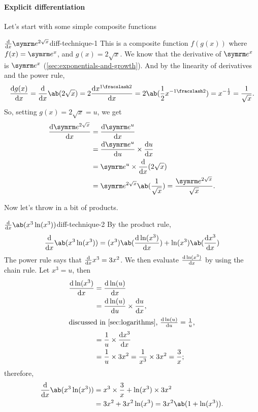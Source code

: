 \paragraph{Explicit differentiation} Let's start with some simple composite functions
\begin{exmp}{$\odv*{\e^{2\sqrt{x}}}{x}$}{diff-technique-1}
  This is a composite function $f(g(x))$ where $f(x) = \e^x$, and $g(x) = 2\sqrt{x}$. We know that the derivative of $\e^x$ is $\e^x$ (\cref{sec:exponentials-and-growth}). And by the linearity of derivatives and the power rule,
  \begin{equation}
    \odv{g(x)}{x} = \odv*{\ab(2\sqrt{x})}{x} = 2\odv{x^{\flatfrac{1}{2}}}{x} = 2\ab(\frac{1}{2}x^{-\flatfrac{1}{2}}) = x^{-\frac{1}{2}} = \frac{1}{\sqrt{x}}.
  \end{equation}
  So, setting $g(x) = 2\sqrt{x} = u$, we get
  \begin{align}
    \odv{\e^{2\sqrt{x}}}{x} & = \odv{\e^u}{x}                                                             \\
                            & = \odv{\e^u}{u}\times\odv{u}{x}                                             \\
                            & = \e^u\times\odv*{(2\sqrt{x})}{x}                                           \\
                            & = \e^{2\sqrt{x}}\ab(\frac{1}{\sqrt{x}}) = \frac{\e^{2\sqrt{x}}}{\sqrt{x}}.
  \end{align}
\end{exmp}
Now let's throw in a bit of products.
\begin{exmp}{$\odv*{\ab(x^3\ln(x^3))}{x}$}{diff-technique-2}
  By the product rule,
  \begin{equation}
    \odv*{\ab(x^3\ln(x^3))}{x} = (x^3)\ab(\odv{\ln(x^3)}{x}) + \ln(x^3)\ab(\odv{x^3}{x})
  \end{equation}
  The power rule says that $\odv*{x^3}{x} = 3x^2$. We then evaluate $\odv{\ln(x^3)}{x}$ by using the chain rule. Let $x^3 = u$, then
  \begin{align}
    \odv{\ln(x^3)}{x} & = \odv{\ln(u)}{x}                                                     \\
                      & = \odv{\ln(u)}{u} \times \odv{u}{x},                                  \\
    \intertext{discussed in \cref{sec:logarithms}, $\odv{\ln(u)}{u} = \frac{1}{u}$,}
                      & = \frac{1}{u} \times \odv{x^3}{x}                                     \\
                      & = \frac{1}{u} \times 3x^2 = \frac{1}{x^3}\times 3x^2  = \frac{3}{x};
  \end{align}
  therefore,
  \begin{align}
    \odv*{\ab(x^3\ln(x^3))}{x} & = x^3\times\frac{3}{x} + \ln(x^3)\times 3x^2    \\
                               & = 3x^2 + 3x^2\ln(x^3) = 3x^2\ab(1 + \ln(x^3)).
  \end{align}
\end{exmp}

